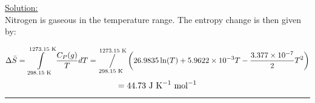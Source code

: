 \noindent
\underline{Solution:}\\

Nitrogen is gaseous in the temperature range. The entropy change is then given by:

$$\Delta\bar{S} = \int\limits_{298.15\textnormal{ K}}^{1273.15\textnormal{ K}}\frac{C_P(g)}{T}dT = \sijoitus{298.15\textnormal{ K}}{1273.15\textnormal{ K}}\left(26.9835\ln(T) + 5.9622\times 10^{-3}T - \frac{3.377\times 10^{-7}}{2}T^2\right)$$
$$= 44.73\textnormal{ J K}^{-1}\textnormal{ mol}^{-1}$$

\hrule\vspace{0.5cm}
